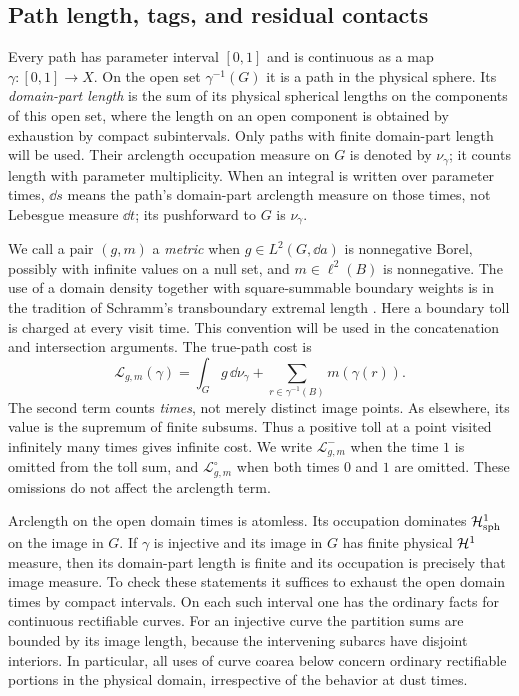 \subsection{Path length, tags, and residual contacts}

Every path has parameter interval $[0,1]$ and is continuous as a map
$\gamma:[0,1]\to X$.  On the open set $\gamma^{-1}(G)$ it is a path
in the physical sphere.  Its \emph{domain-part length} is the sum of
its physical spherical lengths on the components of this open set,
where the length on an open component is obtained by exhaustion by
compact subintervals.  Only paths with finite domain-part length will
be used.  Their arclength occupation measure on $G$ is denoted by
$\nu_\gamma$; it counts length with parameter multiplicity.
When an integral is written over parameter times, $\dd s$ means the
path's domain-part arclength measure on those times, not Lebesgue
measure $\dd t$; its pushforward to $G$ is $\nu_\gamma$.

We call a pair $(g,m)$ a \emph{metric} when $g\in L^2(G,\dd a)$
is nonnegative Borel, possibly with infinite values on a null set,
and $m\in\ell^2(B)$ is nonnegative.  The use of a domain
density together with square-summable boundary weights is in the
tradition of Schramm's transboundary extremal length
\cite{Schramm1995}.  Here a boundary toll is charged at every visit
time.  This convention will be used in the concatenation and
intersection arguments.  The true-path cost is
\begin{equation}\label{eq:true-path-cost}
 \mathcal L_{g,m}(\gamma)
 =\int_G g\,\dd\nu_\gamma
   +\sum_{r\in\gamma^{-1}(B)}m(\gamma(r)).
\end{equation}
The second term counts \emph{times}, not merely distinct image points.
As elsewhere, its value is the supremum of finite subsums.  Thus a
positive toll at a point visited infinitely many times gives infinite
cost.  We write $\mathcal L^-_{g,m}$ when the time $1$ is omitted from
the toll sum, and $\mathcal L^\circ_{g,m}$ when both times $0$ and $1$
are omitted.  These omissions do not affect the arclength term.

Arclength on the open domain times is atomless.  Its occupation
dominates $\mathcal H^1_{\mathrm{sph}}$ on the image in $G$.  If $\gamma$ is
injective and its image in $G$ has finite physical $\mathcal H^1$ measure,
then its domain-part length is finite and its occupation is precisely
that image measure.  To check these statements it suffices to exhaust
the open domain times by compact intervals.  On each such interval
one has the ordinary facts for continuous rectifiable curves.  For an
injective curve the partition sums are bounded by its image length,
because the intervening subarcs have disjoint interiors.  In particular,
all uses of curve coarea below concern ordinary rectifiable portions
in the physical domain, irrespective of the behavior at dust times.


